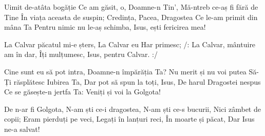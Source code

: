 \beginverse
Uimit de-atâta bogăție
Ce am găsit, o, Doamne-n Tin’,
Mă-ntreb ce-aș fi fără de Tine
În viața aceasta de suspin;
Credința, Pacea, Dragostea
Ce le-am primit din mâna Ta
Pentru nimic nu le-aș schimba,
Isus, ești fericirea mea!
\endverse

\beginchorus
La Calvar păcatul mi-e șters,
La Calvar eu Har primesc;
/: La Calvar, mântuire am în dar,
Îți mulțumesc, Isus, pentru Calvar. :/
\endchorus

\beginverse
Cine sunt eu să pot intra,
Doamne-n împărăția Ta?
Nu merit și nu voi putea
Să-Ți răsplătesc Iubirea Ta,
Dar pot să spun la toți, Isus,
De harul Dragostei nespus
Ce se găsește-n jertfa Ta:
Veniți și voi la Golgota!
\endverse

\beginverse*
De n-ar fi Golgota,
N-am ști ce-i dragostea,
N-am ști ce-s bucurii,
Nici zâmbet de copii;
Eram pierduți pe veci,
Legați în lanțuri reci,
În moarte și păcat,
Dar Isus ne-a salvat!
\endverse
\endsong